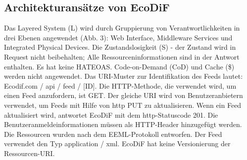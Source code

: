 \documentclass{acmsiggraph}
\begin{document}
\subsection{Architekturansätze von EcoDiF}
Das Layered System (L) wird durch Gruppierung von Verantwortlichkeiten in drei Ebenen angewendet (Abb. 3): Web Interface, Middleware Services und Integrated Physical Devices.
Die Zustandslosigkeit (S) - der Zustand wird in Request nicht beibehalten; Alle Ressourceninformationen sind in der Antwort enthalten. Es hat keine HATEOAS. Code-on-Demand (CoD) und Cache (\$) werden nicht angewendet.
Das URI-Muster zur Identifikation des Feeds lautet:
Ecodif.com / api / feed / [ID]. Die HTTP-Methode, die verwendet wird, um einen Feed anzufordern, ist GET. Der gleiche URI wird von Benutzeranbietern verwendet, um Feeds mit Hilfe von http PUT zu aktualisieren. Wenn ein Feed aktualisiert wird, antwortet EcoDiF mit dem http-Statuscode 201.
Die Benutzeranmeldeinformationen müssen als HTTP-Header hinzugefügt werden.
Die Ressourcen wurden nach dem EEML-Protokoll entworfen.
Der Feed verwendet den Typ application / xml.
EcoDiF hat keine Versionierung der Ressourcen-URI.
\end{document}
